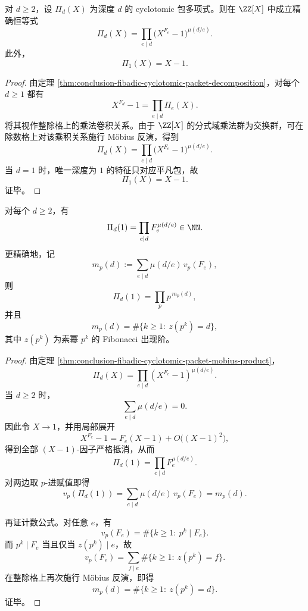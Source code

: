 \begin{theorem}\label{thm:conclusion-fibadic-cyclotomic-packet-mobius-product}
对 \(d\ge 2\)，设 \(\Pi_d(X)\) 为深度 \(d\) 的 cyclotomic 包多项式。则在 \(\ZZ[X]\) 中成立精确恒等式
\[
\Pi_d(X)=\prod_{e\mid d}\bigl(X^{F_e}-1\bigr)^{\mu(d/e)}.
\]
此外，
\[
\Pi_1(X)=X-1.
\]
\end{theorem}
\begin{proof}
由定理 \ref{thm:conclusion-fibadic-cyclotomic-packet-decomposition}，对每个 \(d\ge 1\) 都有
\[
X^{F_d}-1=\prod_{e\mid d}\Pi_e(X).
\]
将其视作整除格上的乘法卷积关系。由于 \(\ZZ[X]\) 的分式域乘法群为交换群，可在除数格上对该乘积关系施行 Möbius 反演，得到
\[
\Pi_d(X)=\prod_{e\mid d}\bigl(X^{F_e}-1\bigr)^{\mu(d/e)}.
\]
当 \(d=1\) 时，唯一深度为 \(1\) 的特征只对应平凡包，故
\[
\Pi_1(X)=X-1.
\]
证毕。
\end{proof}

\begin{theorem}[深度包在 \texorpdfstring{$X=1$}{X=1} 处的 \texorpdfstring{$p$}{p}-进内容公式]\label{thm:conclusion-fibadic-cyclotomic-packet-padic-content}
对每个 \(d\ge 2\)，有
\[
\Pi_d(1)=\prod_{e\mid d}F_e^{\mu(d/e)}\in \NN.
\]
更精确地，记
\[
m_p(d):=\sum_{e\mid d}\mu(d/e)\,v_p(F_e),
\]
则
\[
\Pi_d(1)=\prod_p p^{\,m_p(d)},
\]
并且
\[
m_p(d)=\#\{k\ge 1:\ z(p^k)=d\},
\]
其中 \(z(p^k)\) 为素幂 \(p^k\) 的 Fibonacci 出现阶。
\end{theorem}
\begin{proof}
由定理 \ref{thm:conclusion-fibadic-cyclotomic-packet-mobius-product}，
\[
\Pi_d(X)=\prod_{e\mid d}(X^{F_e}-1)^{\mu(d/e)}.
\]
当 \(d\ge 2\) 时，
\[
\sum_{e\mid d}\mu(d/e)=0.
\]
因此令 \(X\to 1\)，并用局部展开
\[
X^{F_e}-1=F_e(X-1)+O\bigl((X-1)^2\bigr),
\]
得到全部 \((X-1)\)-因子严格抵消，从而
\[
\Pi_d(1)=\prod_{e\mid d}F_e^{\mu(d/e)}.
\]
对两边取 \(p\)-进赋值即得
\[
v_p(\Pi_d(1))
=
\sum_{e\mid d}\mu(d/e)\,v_p(F_e)
=
m_p(d).
\]

再证计数公式。对任意 \(e\)，有
\[
v_p(F_e)=\#\{k\ge 1:\ p^k\mid F_e\}.
\]
而 \(p^k\mid F_e\) 当且仅当 \(z(p^k)\mid e\)，故
\[
v_p(F_e)
=
\sum_{f\mid e}\#\{k\ge 1:\ z(p^k)=f\}.
\]
在整除格上再次施行 Möbius 反演，即得
\[
m_p(d)=\#\{k\ge 1:\ z(p^k)=d\}.
\]
证毕。
\end{proof}

